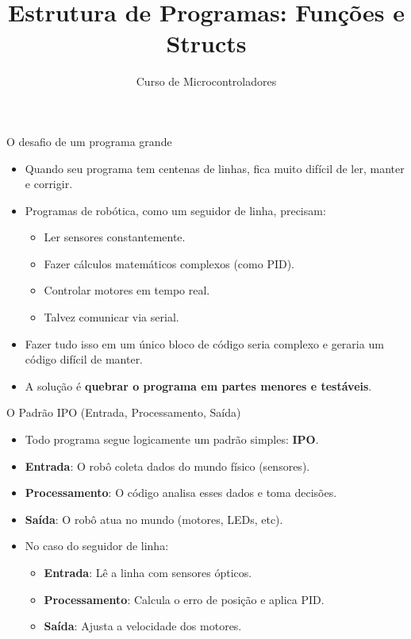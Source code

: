 \documentclass[10pt]{beamer}
\title{Estrutura de Programas: Funções e Structs}
\subtitle{Curso de Microcontroladores}
\author{}
\date{}
\begin{document}
\begin{frame}
  \titlepage
\end{frame}

\begin{frame}{O desafio de um programa grande}
  \begin{itemize}
    \item Quando seu programa tem centenas de linhas, fica muito difícil de ler, manter e corrigir.
    \item Programas de robótica, como um seguidor de linha, precisam:
    \begin{itemize}
      \item Ler sensores constantemente.
      \item Fazer cálculos matemáticos complexos (como PID).
      \item Controlar motores em tempo real.
      \item Talvez comunicar via serial.
    \end{itemize}
    \item Fazer tudo isso em um único bloco de código seria complexo e geraria um código difícil de manter.
    \item A solução é \textbf{quebrar o programa em partes menores e testáveis}.
  \end{itemize}
\end{frame}

\begin{frame}{O Padrão IPO (Entrada, Processamento, Saída)}
  \begin{itemize}
    \item Todo programa segue logicamente um padrão simples: \textbf{IPO}.
    \item \textbf{Entrada}: O robô coleta dados do mundo físico (sensores).
    \item \textbf{Processamento}: O código analisa esses dados e toma decisões.
    \item \textbf{Saída}: O robô atua no mundo (motores, LEDs, etc).
    \item No caso do seguidor de linha:
    \begin{itemize}
      \item \textbf{Entrada}: Lê a linha com sensores ópticos.
      \item \textbf{Processamento}: Calcula o erro de posição e aplica PID.
      \item \textbf{Saída}: Ajusta a velocidade dos motores.
    \end{itemize}
  \end{itemize}
\end{frame}
\end{document}
